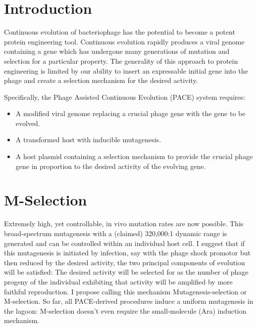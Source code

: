 \documentclass[10pt,letterpaper]{article}
\begin{document}


\section*{Introduction}
Continuous evolution of bacteriophage has the potential to become a potent protein engineering tool\cite{pace}\cite{monsanto}.
Continuous evolution rapidly produces a viral genome containing a gene
which has undergone many generations of mutation and selection for
a particular property.  The generality of this approach to protein engineering
is limited by our ability to insert an expressable initial gene into the phage and create a selection mechanism for the desired activity.

Specifically, the Phage Assisted Continuous Evolution (PACE)\cite{pace} system requires:
\begin{itemize}

\item{}
A modified viral genome replacing a crucial phage gene with the gene to be evolved.

\item{}
A transformed host with inducible mutagenesis.

\item{}
A host plasmid containing a selection mechanism to provide the crucial phage gene in proportion to the desired activity of the evolving gene.
\end{itemize}

\section{M-Selection}
Extremely high, yet controllable, in vivo mutation rates are now possible\cite{mutation}.  This broad-spectrum mutagenesis with a (claimed) 320,000:1 dynamic range is generated and can be controlled within an individual host cell.  I suggest that if this mutagenesis is initiated  by infection, say with the phage shock promotor but then reduced by the desired activity, the two principal components of evolution will be satisfied: The desired activity will be selected for as the number of phage progeny of the individual exhibiting that activity will be amplified by more faithful reproduction.  I propose calling this mechanism Mutagenesis-selection or M-selection.  So far, all PACE-derived procedures induce a uniform mutagenesis in the lagoon: M-selection doesn't even require the small-molecule (Ara) induction mechanism.
\end{document}
